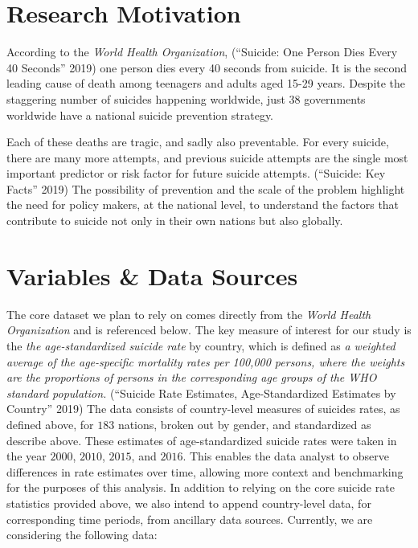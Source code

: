 \documentclass[]{article}
\begin{document}
\section{Research Motivation}\label{research-motivation}

According to the \emph{World Health Organization}, (``Suicide: One
Person Dies Every 40 Seconds'' 2019) one person dies every 40 seconds
from suicide. It is the second leading cause of death among teenagers
and adults aged 15-29 years. Despite the staggering number of suicides
happening worldwide, just 38 governments worldwide have a national
suicide prevention strategy.

Each of these deaths are tragic, and sadly also preventable. For every
suicide, there are many more attempts, and previous suicide attempts are
the single most important predictor or risk factor for future suicide
attempts. (``Suicide: Key Facts'' 2019) The possibility of prevention
and the scale of the problem highlight the need for policy makers, at
the national level, to understand the factors that contribute to suicide
not only in their own nations but also globally.

\section{Variables \& Data Sources}\label{variables-data-sources}

The core dataset we plan to rely on comes directly from the \emph{World
Health Organization} and is referenced below. The key measure of
interest for our study is the \emph{the age-standardized suicide rate}
by country, which is defined as \emph{a weighted average of the
age-specific mortality rates per 100,000 persons, where the weights are
the proportions of persons in the corresponding age groups of the WHO
standard population.} (``Suicide Rate Estimates, Age-Standardized
Estimates by Country'' 2019) The data consists of country-level measures
of suicides rates, as defined above, for \(183\) nations, broken out by
gender, and standardized as describe above. These estimates of
age-standardized suicide rates were taken in the year \(2000\),
\(2010\), \(2015\), and \(2016\). This enables the data analyst to
observe differences in rate estimates over time, allowing more context
and benchmarking for the purposes of this analysis. In addition to
relying on the core suicide rate statistics provided above, we also
intend to append country-level data, for corresponding time periods,
from ancillary data sources. Currently, we are considering the following
data:
\end{document}
